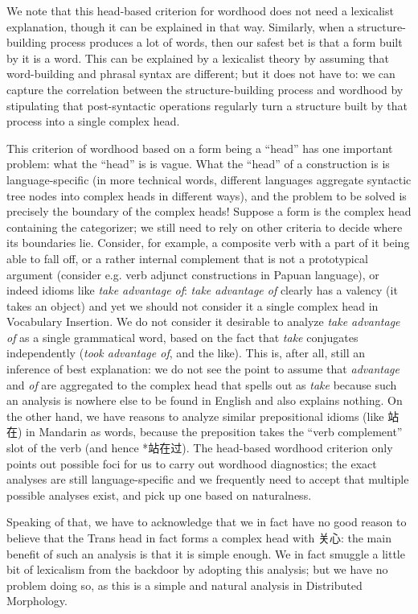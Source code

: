 \documentclass[UTF8, a4paper, oneside, scheme=plain, 12pt]{ctexrep}
\newcommand{\form}[1]{\emph{#1}}
\begin{document}
{We note that this head-based criterion for wordhood does not need a lexicalist explanation, though it can be explained in that way. 
Similarly, when a structure-building process produces a lot of words, then our safest bet is that a form built by it is a word.
This can be explained by a lexicalist theory by assuming that word-building and phrasal syntax are different; but it does not have to:
we can capture the correlation between the structure-building process and wordhood by stipulating that post-syntactic operations regularly turn a structure built by that process into a single complex head.

This criterion of wordhood based on a form being a ``head'' has one important problem: what the ``head'' is is vague.
What the ``head'' of a construction is is language-specific (in more technical words, different languages aggregate syntactic tree nodes into complex heads in different ways), 
and the problem to be solved is precisely the boundary of the complex heads!
Suppose a form is the complex head containing the categorizer; we still need to rely on other criteria to decide where its boundaries lie. 
Consider, for example, a composite verb with a part of it being able to fall off, or a rather  internal complement that is not a prototypical argument (consider e.g. verb adjunct constructions in Papuan language), 
or indeed idioms like \form{take advantage of}:
\form{take advantage of} clearly has a valency (it takes an object) and yet we should not consider it a single complex head in Vocabulary Insertion.
We do not consider it desirable to analyze \form{take advantage of} as a single grammatical word, based on the fact that \form{take} conjugates independently (\form{took advantage of}, and the like).
This is, after all, still an inference of best explanation:
we do not see the point to assume that \form{advantage} and \form{of} are aggregated to the complex head that spells out as \form{take} because such an analysis is nowhere else to be found in English and also explains nothing.
On the other hand, we have reasons to analyze similar prepositional idioms (like 站在) in Mandarin as words, because the preposition takes the ``verb complement'' slot of the verb
(and hence *站在过).
The head-based wordhood criterion only points out possible foci for us to carry out wordhood diagnostics;
the exact analyses are still language-specific and we frequently need to accept that multiple possible analyses exist, and pick up one based on naturalness.

Speaking of that, we have to acknowledge that we in fact have no good reason to believe that the Trans head in fact forms a complex head with 关心:
the main benefit of such an analysis is that it is simple enough.
We in fact smuggle a little bit of lexicalism from the backdoor by adopting this analysis;
but we have no problem doing so, as this is a simple and natural analysis in Distributed Morphology.

}
\end{document}
